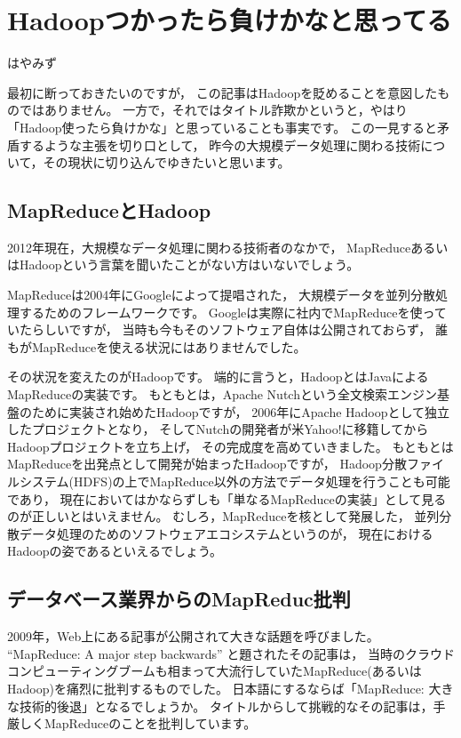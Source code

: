 
\chapter{Hadoopつかったら負けかなと思ってる}

\begin{flushright}
はやみず
\end{flushright}

最初に断っておきたいのですが，
この記事はHadoopを貶めることを意図したものではありません。
一方で，それではタイトル詐欺かというと，やはり「Hadoop使ったら負けかな」と思っていることも事実です。
この一見すると矛盾するような主張を切り口として，
昨今の大規模データ処理に関わる技術について，その現状に切り込んでゆきたいと思います。

\section{MapReduceとHadoop}

2012年現在，大規模なデータ処理に関わる技術者のなかで，
MapReduceあるいはHadoopという言葉を聞いたことがない方はいないでしょう。

MapReduceは2004年にGoogleによって提唱された，
大規模データを並列分散処理するためのフレームワークです。
Googleは実際に社内でMapReduceを使っていたらしいですが，
当時も今もそのソフトウェア自体は公開されておらず，
誰もがMapReduceを使える状況にはありませんでした。

その状況を変えたのがHadoopです。
端的に言うと，HadoopとはJavaによるMapReduceの実装です。
もともとは，Apache Nutchという全文検索エンジン基盤のために実装され始めたHadoopですが，
2006年にApache Hadoopとして独立したプロジェクトとなり，
そしてNutchの開発者が米Yahoo!に移籍してからHadoopプロジェクトを立ち上げ，
その完成度を高めていきました。
もともとはMapReduceを出発点として開発が始まったHadoopですが，
Hadoop分散ファイルシステム(HDFS)の上でMapReduce以外の方法でデータ処理を行うことも可能であり，
現在においてはかならずしも「単なるMapReduceの実装」として見るのが正しいとはいえません。
むしろ，MapReduceを核として発展した，
並列分散データ処理のためのソフトウェアエコシステムというのが，
現在におけるHadoopの姿であるといえるでしょう。

\section{データベース業界からのMapReduc批判}

2009年，Web上にある記事が公開されて大きな話題を呼びました。
``MapReduce: A major step backwards'' と題されたその記事は，
当時のクラウドコンピューティングブームも相まって大流行していたMapReduce(あるいはHadoop)を痛烈に批判するものでした。
日本語にするならば「MapReduce: 大きな技術的後退」となるでしょうか。
タイトルからして挑戦的なその記事は，手厳しくMapReduceのことを批判しています。

